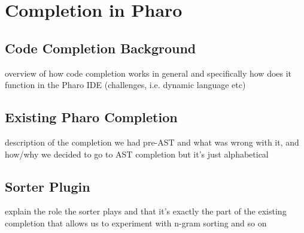 \chapter{Completion in Pharo}
\label{chap:Completion in Pharo}

\section{Code Completion Background}
overview of how code completion works in general and specifically how does it function in the Pharo IDE (challenges, i.e. dynamic language etc)

\section{Existing Pharo Completion}
description of the completion we had pre-AST and what was wrong with it, and how/why we decided to go to AST completion but it's just alphabetical

\section{Sorter Plugin}
explain the role the sorter plays and that it's exactly the part of the existing completion that allows us to experiment with n-gram sorting and so on
